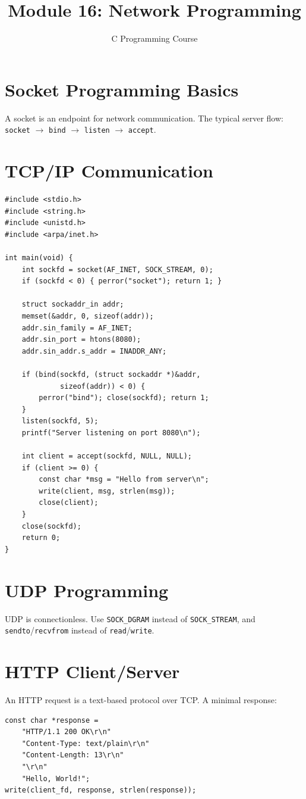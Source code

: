\documentclass[11pt,a4paper]{article}
\title{Module 16: Network Programming}
\author{C Programming Course}
\date{}
\begin{document}
\maketitle
\thispagestyle{fancy}

\section{Socket Programming Basics}
A socket is an endpoint for network communication. The typical server flow:
\texttt{socket} $\to$ \texttt{bind} $\to$ \texttt{listen} $\to$ \texttt{accept}.

\section{TCP/IP Communication}
\begin{lstlisting}
#include <stdio.h>
#include <string.h>
#include <unistd.h>
#include <arpa/inet.h>

int main(void) {
    int sockfd = socket(AF_INET, SOCK_STREAM, 0);
    if (sockfd < 0) { perror("socket"); return 1; }

    struct sockaddr_in addr;
    memset(&addr, 0, sizeof(addr));
    addr.sin_family = AF_INET;
    addr.sin_port = htons(8080);
    addr.sin_addr.s_addr = INADDR_ANY;

    if (bind(sockfd, (struct sockaddr *)&addr,
             sizeof(addr)) < 0) {
        perror("bind"); close(sockfd); return 1;
    }
    listen(sockfd, 5);
    printf("Server listening on port 8080\n");

    int client = accept(sockfd, NULL, NULL);
    if (client >= 0) {
        const char *msg = "Hello from server\n";
        write(client, msg, strlen(msg));
        close(client);
    }
    close(sockfd);
    return 0;
}
\end{lstlisting}

\section{UDP Programming}
UDP is connectionless. Use \texttt{SOCK\_DGRAM} instead of \texttt{SOCK\_STREAM},
and \texttt{sendto}/\texttt{recvfrom} instead of \texttt{read}/\texttt{write}.

\section{HTTP Client/Server}
An HTTP request is a text-based protocol over TCP. A minimal response:
\begin{lstlisting}
const char *response =
    "HTTP/1.1 200 OK\r\n"
    "Content-Type: text/plain\r\n"
    "Content-Length: 13\r\n"
    "\r\n"
    "Hello, World!";
write(client_fd, response, strlen(response));
\end{lstlisting}
\end{document}
